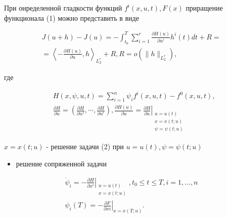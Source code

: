 \documentclass[10pt]{article}
\begin{document}
При онределенной гладкости функций $f^{i}(x, u, t), F(x)$ приращение функционала (1) можно представить в виде



\[

\begin{gathered}

J(u+h)-J(u)=-\int_{t_{0}}^{T} \sum_{i=1}^{r} \frac{\partial H(u)}{\partial u^{i}} h^{i}(t) d t+R= \\

=\left\langle-\frac{\partial H(u)}{\partial u}, h\right\rangle_{L_{2}^{r}}+R, R=o\left(\|h\|_{L_{2}^{r}}\right),

\end{gathered}

\]



где



\[

\begin{aligned}

& H(x, \psi, u, t)=\sum_{i=1}^{n} \psi_{i} f^{i}(x, u, t)-f^{0}(x, u, t), \\

& \frac{\partial H}{\partial u}=\left(\frac{\partial H}{\partial u^{1}}, \cdots, \frac{\partial H}{\partial u^{r}}\right), \frac{\partial H(u)}{\partial u}=\left.\frac{\partial H}{\partial u}\right|_{\begin{array}{l}

u=u(t) \\

x=x(t ; u) \\

\psi=\psi(t ; u)

\end{array}}

\end{aligned}

\]



$x=x(t ; u)$ - решение задачи (2) при $u=u(t), \psi=\psi(t ; u)$



\begin{itemize}

  \item решение сопряженной задачи

\end{itemize}



\[

\begin{gathered}

\dot{\psi}_{i}=-\left.\frac{\partial H}{\partial x^{i}}\right|_{\substack{u=u(t) \\

x=x(t ; u)}}, t_{0} \leqslant t \leqslant T, i=1, \ldots, n \\

\psi_{i}(T)=-\left.\frac{\partial F}{\partial x i}\right|_{x=x(T ; u)} .

\end{gathered}

\]
\end{document}
